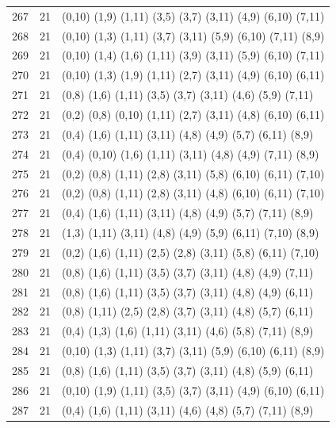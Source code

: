 \begin{appendix}
{\begin{longtable}{lll}
    267& 21 & (0,10)  (1,9)   (1,11)  (3,5)   (3,7)   (3,11)  (4,9)   (6,10)  (7,11)\\
    268& 21 & (0,10)  (1,3)   (1,11)  (3,7)   (3,11)  (5,9)   (6,10)  (7,11)  (8,9)\\
    269& 21 & (0,10)  (1,4)   (1,6)   (1,11)  (3,9)   (3,11)  (5,9)   (6,10)  (7,11)\\
    270& 21 & (0,10)  (1,3)   (1,9)   (1,11)  (2,7)   (3,11)  (4,9)   (6,10)  (6,11)\\
    271& 21 & (0,8)   (1,6)   (1,11)  (3,5)   (3,7)   (3,11)  (4,6)   (5,9)   (7,11)\\
    272& 21 & (0,2)   (0,8)   (0,10)  (1,11)  (2,7)   (3,11)  (4,8)   (6,10)  (6,11)\\
    273& 21 & (0,4)   (1,6)   (1,11)  (3,11)  (4,8)   (4,9)   (5,7)   (6,11)  (8,9)\\
    274& 21 & (0,4)   (0,10)  (1,6)   (1,11)  (3,11)  (4,8)   (4,9)   (7,11)  (8,9)\\
    275& 21 & (0,2)   (0,8)   (1,11)  (2,8)   (3,11)  (5,8)   (6,10)  (6,11)  (7,10)\\
    276& 21 & (0,2)   (0,8)   (1,11)  (2,8)   (3,11)  (4,8)   (6,10)  (6,11)  (7,10)\\
    277& 21 & (0,4)   (1,6)   (1,11)  (3,11)  (4,8)   (4,9)   (5,7)   (7,11)  (8,9)\\
    278& 21 & (1,3)   (1,11)  (3,11)  (4,8)   (4,9)   (5,9)   (6,11)  (7,10)  (8,9)\\
    279& 21 & (0,2)   (1,6)   (1,11)  (2,5)   (2,8)   (3,11)  (5,8)   (6,11)  (7,10)\\
    280& 21 & (0,8)   (1,6)   (1,11)  (3,5)   (3,7)   (3,11)  (4,8)   (4,9)   (7,11)\\
    281& 21 & (0,8)   (1,6)   (1,11)  (3,5)   (3,7)   (3,11)  (4,8)   (4,9)   (6,11)\\
    282& 21 & (0,8)   (1,11)  (2,5)   (2,8)   (3,7)   (3,11)  (4,8)   (5,7)   (6,11)\\
    283& 21 & (0,4)   (1,3)   (1,6)   (1,11)  (3,11)  (4,6)   (5,8)   (7,11)  (8,9)\\
    284& 21 & (0,10)  (1,3)   (1,11)  (3,7)   (3,11)  (5,9)   (6,10)  (6,11)  (8,9)\\
    285& 21 & (0,8)   (1,6)   (1,11)  (3,5)   (3,7)   (3,11)  (4,8)   (5,9)   (6,11)\\
    286& 21 & (0,10)  (1,9)   (1,11)  (3,5)   (3,7)   (3,11)  (4,9)   (6,10)  (6,11)\\
    287& 21 & (0,4)   (1,6)   (1,11)  (3,11)  (4,6)   (4,8)   (5,7)   (7,11)  (8,9)\\

\end{longtable}}
\end{appendix}
